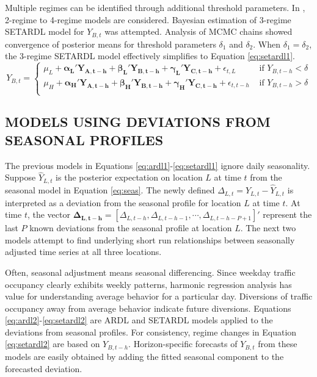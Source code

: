 Multiple regimes can be identified through additional threshold parameters. In \cite{Kamarianakis2010}, 2-regime to 4-regime models are considered. Bayesian estimation of  3-regime SETARDL model for $Y_{B,t}$ was attempted. Analysis of MCMC chains showed convergence of posterior means for threshold parameters $\delta_1$ and $\delta_2$. When $\delta_1=\delta_2$, the 3-regime SETARDL model effectively simplifies to Equation \ref{eq:setardl1}.
\begin{equation}
\label{eq:setardl1}
Y_{B,t}=
  \begin{cases}
    \mu_L+\bm{\alpha_L}'\bm{Y_{A,t-h}}+\bm{\beta_L}'\bm{Y_{B,t-h}}+\bm{\gamma_L}'\bm{Y_{C,t-h}}+\epsilon_{t,L} & \textrm{ if } Y_{B,t-h}<\delta \\
    \mu_H+\bm{\alpha_H}'\bm{Y_{A,t-h}}+\bm{\beta_H}'\bm{Y_{B,t-h}}+\bm{\gamma_H}'\bm{Y_{C,t-h}}+\epsilon_{t,t-h} & \textrm{ if } Y_{B,t-h}>\delta \\
  \end{cases}
\end{equation}

\subsection{MODELS USING DEVIATIONS FROM SEASONAL PROFILES}
The previous models in Equations \ref{eq:ardl1}-\ref{eq:setardl1} ignore daily seasonality. Suppose $\widehat{Y}_{L,t}$ is the posterior expectation on location $L$ at time $t$ from the seasonal model in Equation \ref{eq:seas}. The newly defined  $\Delta_{L,t}=Y_{L,t}-\widehat{Y}_{L,t}$ is interpreted as a deviation from the seasonal profile for location $L$ at time $t$. At time $t$, the vector $\bm{\Delta_{L,t-h}}=[\Delta_{L,t-h},\Delta_{L,t-h-1},\cdots,\Delta_{L,t-h-P+1}]'$ represent the last $P$ known deviations from the seasonal profile at location $L$. The next two models attempt to find underlying short run relationships between seasonally adjusted time series at all three locations.

Often, seasonal adjustment means seasonal differencing. Since weekday traffic occupancy clearly exhibits weekly patterns, harmonic regression analysis has value for understanding average behavior for a particular day. Diversions of traffic occupancy away from average behavior indicate future diversions.  Equations \ref{eq:ardl2}-\ref{eq:setardl2} are ARDL and SETARDL models applied to the deviations from seasonal profiles. For consistency, regime changes in Equation \ref{eq:setardl2} are based on $Y_{B,t-h}$. Horizon-specific forecasts of $Y_{B,t}$ from these models are easily obtained by adding the fitted seasonal component to the forecasted deviation. 

